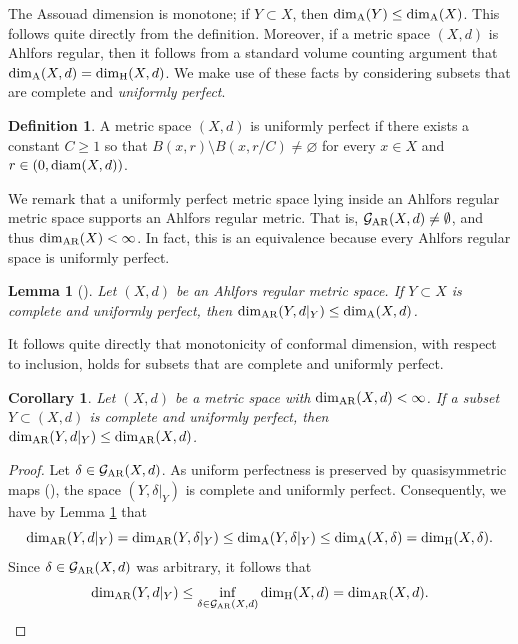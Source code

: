 \documentclass{amsart}
\newcommand{\diam}{{\rm diam}}
\newcommand{\AR}{{\rm AR}}
\newcommand{\A}{{\rm A}}
\newtheorem{lemma}[equation]{Lemma}
\newtheorem{corollary}[equation]{Corollary}
\numberwithin{equation}{section}
\theoremstyle{definition}
\newtheorem{definition}[equation]{Definition}
\theoremstyle{remark}
\newcommand{\cG}{\mathcal{G}}
\begin{document}
The Assouad dimension is monotone; if \(Y\subset X\), then \(\dim_\A(Y)\leq \dim_\A(X)\). This follows quite directly from the definition. Moreover, if a metric space \((X,d)\) is Ahlfors regular, then it follows from a standard volume counting argument that \(\dim_\A(X,d)=\dim_{\mathrm{H}}(X,d)\). We make use of these facts by considering subsets that are complete and \emph{uniformly perfect}.

\begin{definition}
 A metric space \((X,d)\) is uniformly perfect if there exists a constant \(C\geq 1\) so that 
        \(
            B(x,r)\setminus B(x,r/C)\neq \varnothing
        \)
    for every \(x\in X\) and \(r\in(0,\diam(X,d))\).    
\end{definition}

We remark that a uniformly perfect metric space lying inside an Ahlfors regular metric space supports an Ahlfors regular metric. That is, $\cG_{\AR}(X,d)\neq \emptyset$, and thus $\dim_{\AR}(X)<\infty$. In fact, this is an equivalence because every Ahlfors regular space is uniformly perfect.

\begin{lemma}[{\cite[Proposition 14.14]{He}}]\label{Lemma: Confdim bound by Assouad dimension}
    Let \((X,d)\) be an Ahlfors regular metric space. If \(Y\subset X\) is complete and uniformly perfect, then  \(\dim_\AR(Y,d\vert_Y)\leq \dim_{\mathrm{A}}(X,d)\). 
\end{lemma}

It follows quite directly that monotonicity of conformal dimension, with respect to inclusion, holds for subsets that are complete and uniformly perfect.
 

\begin{corollary}\label{Corollary: Confdim bound for uniformly perfect subset}
    Let \((X,d)\) be a metric space with \(\dim_\AR(X,d)<\infty\). If a subset \(Y\subset (X,d)\) is complete and uniformly perfect, then \(\dim_\AR(Y,d\vert_Y)\leq \dim_\AR(X,d)\).
\end{corollary}
    \begin{proof}
        Let \(\delta\in \cG_\AR(X,d)\). As uniform perfectness is preserved by quasisymmetric maps (\cite[Exercise 11.2]{He}), the space \((Y,\delta\vert_Y)\) is complete and uniformly perfect. Consequently, we have by Lemma \ref{Lemma: Confdim bound by Assouad dimension} that
            \[
            \dim_\AR(Y,d\vert_Y)=\dim_\AR(Y,\delta\vert_Y)\leq \dim_\A(Y,\delta\vert_Y)\leq \dim_\A(X,\delta)=\dim_{\mathrm{H}}(X,\delta).
            \]
        Since \(\delta\in \cG_\AR(X,d)\) was arbitrary, it follows that 
            \[
            \dim_\AR(Y,d\vert_Y)\leq \inf_{\delta\in\cG_\AR(X,d)}\dim_{\mathrm{H}}(X,d)=\dim_\AR(X,d).
            \]  
    \end{proof}
\end{document}
